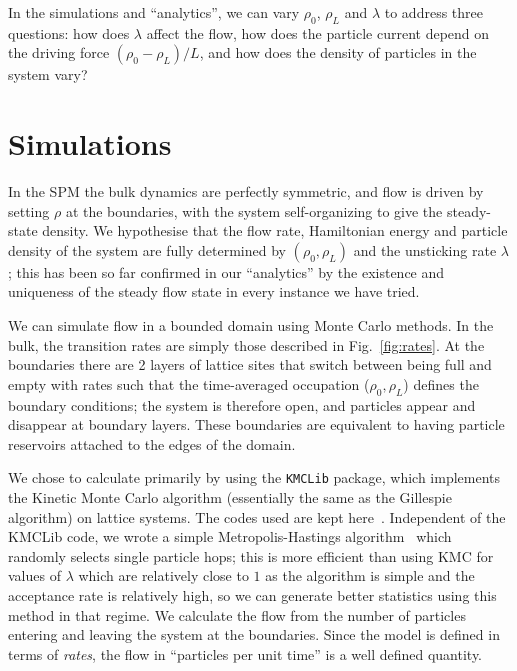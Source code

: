 \documentclass[
reprint, amsmath,amssymb,
]{revtex4-1}
\begin{document}
In the simulations and ``analytics'', we can vary $\rho_0$, $\rho_L$ and $\lambda$ to
address three questions: how does $\lambda$ affect the flow, how does
the particle current depend on the driving force $(\rho_0 - \rho_L)/L$, and
how does the density of particles in the system vary?


\section{Simulations}

In the SPM the bulk dynamics are perfectly symmetric, and flow is driven by
setting $\rho$ at the boundaries, with the system self-organizing to
give the steady-state density. We hypothesise that the flow rate, Hamiltonian energy and particle density of the system are fully determined by  $(\rho_0, \rho_L)$ and the unsticking rate $\lambda$;
this has been so far confirmed in our ``analytics'' by the existence and uniqueness of the steady flow state in every instance we have tried.


We can simulate flow in a bounded domain using Monte Carlo methods. In the bulk, the transition rates are simply
those described in Fig.~\ref{fig:rates}. At the boundaries there
are 2 layers of lattice sites that switch between being full and empty
with rates such that the time-averaged occupation ($\rho_0, \rho_L$)
defines the boundary conditions; the system is therefore open, and
particles appear and disappear at boundary layers.  These boundaries
are equivalent to having particle reservoirs attached to the edges of the
domain.

We chose to calculate primarily by using the \texttt{KMCLib}\cite{leetmaa2014kmclib}
package, which implements the Kinetic Monte Carlo algorithm
(essentially the same as the Gillespie algorithm\cite{Gillespie1977,
 Bortz1975, Prados1997}) on lattice systems. The codes used are kept
here~\cite{jHellGitRepo}.
Independent of the KMCLib code, we wrote a simple Metropolis-Hastings
algorithm~\cite{metHastAlg} which randomly selects single particle hops; this is more efficient than using KMC for values of
$\lambda$ which are relatively close to $1$ as the algorithm is simple and the acceptance rate is relatively high, so we can generate better statistics using this method in that regime.
We calculate the flow from the number of particles entering and
leaving the system at the boundaries.  Since the model is defined in
terms of {\it rates}, the flow in ``particles per unit time'' is a well
defined quantity.
\end{document}
